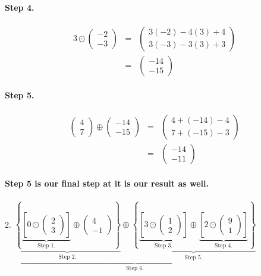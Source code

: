\documentclass[11pt]{article}
\begin{document}
\paragraph{Step 4.}
\begin{eqnarray*}
3
\odot
\begin{pmatrix}
-2\\
-3
\end{pmatrix}
&=&
\begin{pmatrix}
3(-2)-4(3)+4\\
3(-3)-3(3)+3
\end{pmatrix}
\\&=&
\begin{pmatrix}
-14\\
-15
\end{pmatrix}
\end{eqnarray*}
\paragraph{Step 5.}
\begin{eqnarray*}
\begin{pmatrix}
4\\
7
\end{pmatrix}
\oplus
\begin{pmatrix}
-14\\
-15
\end{pmatrix}
&=&
\begin{pmatrix}
4+(-14)-4\\
7+(-15)-3
\end{pmatrix}
\\&=&
\begin{pmatrix}
-14\\
-11
\end{pmatrix}
\end{eqnarray*}
\paragraph{}\textbf{ Step 5 is our final step at it is our result as well.}


\paragraph{}2.
$
\underbrace{
\underbrace{
\left\{
\underbrace{
\left[
0
\odot
\begin{pmatrix}
2\\
3
\end{pmatrix}
\right]
}_\text{Step 1.}
\oplus
\begin{pmatrix}
4\\
-1
\end{pmatrix}
\right\}
}_\text{Step 2.}
\oplus
\underbrace{
\left\{
\underbrace{
\left[
3
\odot
\begin{pmatrix}
1\\
2
\end{pmatrix}
\right]
}_\text{Step 3.}
\oplus
\underbrace{
\left[
2
\odot
\begin{pmatrix}
9\\
1
\end{pmatrix}
\right]
}_\text{Step 4.}
\right\}
}_\text{Step 5.}
}_\text{Step 6.}
$
\end{document}
